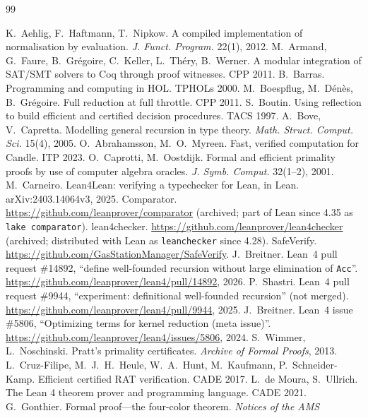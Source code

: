 \documentclass[11pt]{article}
\begin{document}
\begin{thebibliography}{99}\small\raggedright
{} K.~Aehlig, F.~Haftmann, T.~Nipkow. A compiled implementation of normalisation by
  evaluation. \emph{J. Funct. Program.} 22(1), 2012.
 M.~Armand, G.~Faure, B.~Gr\'egoire, C.~Keller, L.~Th\'ery, B.~Werner. A modular
  integration of SAT/SMT solvers to Coq through proof witnesses. CPP 2011.
 B.~Barras. Programming and computing in HOL. TPHOLs 2000.
 M.~Boespflug, M.~D\'en\`es, B.~Gr\'egoire. Full reduction at full throttle.
  CPP 2011.
 S.~Boutin. Using reflection to build efficient and certified decision procedures.
  TACS 1997.
 A.~Bove, V.~Capretta. Modelling general recursion in type theory. \emph{Math. Struct.
  Comput. Sci.} 15(4), 2005.
 O.~Abrahamsson, M.~O.~Myreen. Fast, verified computation for Candle. ITP 2023.
 O.~Caprotti, M.~Oostdijk. Formal and efficient primality proofs by use of
  computer algebra oracles. \emph{J. Symb. Comput.} 32(1--2), 2001.
 M.~Carneiro. Lean4Lean: verifying a typechecker for Lean, in Lean.
  arXiv:2403.14064v3, 2025.
 Comparator. \url{https://github.com/leanprover/comparator} (archived; part of
  Lean since 4.35 as \texttt{lake comparator}).
 lean4checker. \url{https://github.com/leanprover/lean4checker} (archived;
  distributed with Lean as \texttt{leanchecker} since 4.28).
 SafeVerify. \url{https://github.com/GasStationManager/SafeVerify}.
 J.~Breitner. Lean~4 pull request \#14892, ``define well-founded recursion without large
  elimination of \texttt{Acc}''. \url{https://github.com/leanprover/lean4/pull/14892}, 2026.
 P.~Shastri. Lean~4 pull request \#9944, ``experiment: definitional well-founded
  recursion'' (not merged). \url{https://github.com/leanprover/lean4/pull/9944}, 2025.
 J.~Breitner. Lean~4 issue \#5806, ``Optimizing terms for kernel reduction
  (meta issue)''. \url{https://github.com/leanprover/lean4/issues/5806}, 2024.
 S.~Wimmer, L.~Noschinski. Pratt's primality certificates. \emph{Archive of
  Formal Proofs}, 2013.
 L.~Cruz-Filipe, M.~J.~H.~Heule, W.~A.~Hunt, M.~Kaufmann, P.~Schneider-Kamp. Efficient
  certified RAT verification. CADE 2017.
 L.~de Moura, S.~Ullrich. The Lean 4 theorem prover and programming language.
  CADE 2021.
 G.~Gonthier. Formal proof---the four-color theorem. \emph{Notices of the AMS}

\end{thebibliography}
\end{document}
